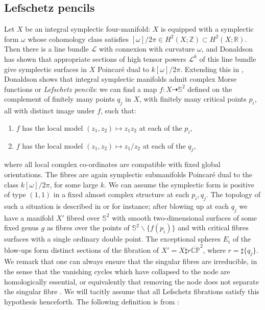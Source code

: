 \documentclass[10pt]{article}
\newcommand{\pp}{\mathbb{P}}
\newcommand{\cc}{\mathbb{C}}
\newcommand{\rr}{\mathbb{R}}
\newcommand{\zz}{\mathbb{Z}}
\newcommand{\sss}{\mathbb{S}}
\newcounter{enum}
\begin{document}

\subsection{Lefschetz pencils}

Let $X$ be an integral symplectic four-manifold: $X$ is
equipped with a symplectic form $\omega$ whose cohomology class
satisfies $[\omega]/2\pi \in H^2(X; \zz) \subset H^2 (X; \rr)$.  Then
there is a line bundle $\mathcal{L}$ with connexion with curvature
$\omega$, and 
Donaldson \cite{Donaldson:submflds} has shown that appropriate sections of high
tensor powers $\mathcal{L}^k$ of 
this line bundle give symplectic surfaces in $X$ Poincar\'e dual to
$k[\omega]/2\pi$.  Extending this in \cite{Donaldson:pencils},
Donaldson shows that 
integral symplectic manifolds admit complex Morse functions or \emph{Lefschetz
pencils}:  we can find a map $f: X \dashrightarrow \sss^2$ defined on
the complement of finitely many points $q_j$ in $X$, with finitely many
critical points $p_i$, all with distinct image under $f$, such that:

\begin{enumerate}
\item $f$ has the local model $(z_1, z_2) \mapsto z_1 z_2$ at each  of
  the $p_i$,
\item $f$ has the local model $(z_1, z_2) \mapsto z_1 / z_2$ at each
  of the $q_j$,
\end{enumerate}

\noindent where all local complex co-ordinates are compatible with
fixed global orientations.  The fibres are again symplectic
submanifolds Poincar\'e dual to the class $k[\omega]/2\pi$, for some
large $k$.  We can assume the symplectic form is positive of
type $(1,1)$ in a fixed almost complex structure at each $p_i, q_j$.
The topology of such a situation is described in \cite{ivanhodge} or
\cite{GompfS} for instance;  after blowing up at each $q_j$ we
have a manifold $X'$ fibred over $\sss^2$ with smooth two-dimensional
surfaces of some fixed genus $g$ as fibres over the points of $\sss^2
\backslash \{f(p_i)\}$ and with critical fibres surfaces with a single
ordinary double point. The exceptional spheres $E_i$ of the blow-ups form
distinct sections of the fibration of $X' = X \sharp r \overline{\cc
  \pp}^2$, where $r = \sharp \{q_j\}$.  We remark that one can always
ensure that the 
singular fibres are irreducible, in the sense that the vanishing
cycles which have collapsed to the node are homologically essential,
or equivalently that removing the node does not separate the singular
fibre \cite{ivanmodulidivisor}.
We will tacitly assume that all Lefschetz fibrations satisfy this
hypothesis henceforth.  The following definition is from \cite{SKDIS}:
\end{document}
